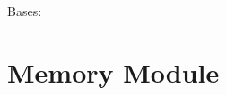 \documentclass[letterpaper,10pt,english]{sphinxmanual}
\begin{document}
\begin{fulllineitems}

\pysigstartsignatures
{}
\pysigstopsignatures
\sphinxAtStartPar
Bases: 


\begin{fulllineitems}

\pysigstartsignatures
{}
\pysigstopsignatures
\end{fulllineitems}



\begin{fulllineitems}

\pysigstartsignatures
{}
\pysigstopsignatures
\end{fulllineitems}



\begin{fulllineitems}

\pysigstartsignatures
{}
\pysigstopsignatures
\end{fulllineitems}


\end{fulllineitems}


\sphinxstepscope


\section{Memory Module}
\label{\detokenize{memory:memory-module}}\label{\detokenize{memory::doc}}

\begin{fulllineitems}

\pysigstartsignatures
{}
\pysigstopsignatures
\end{fulllineitems}
\end{document}
